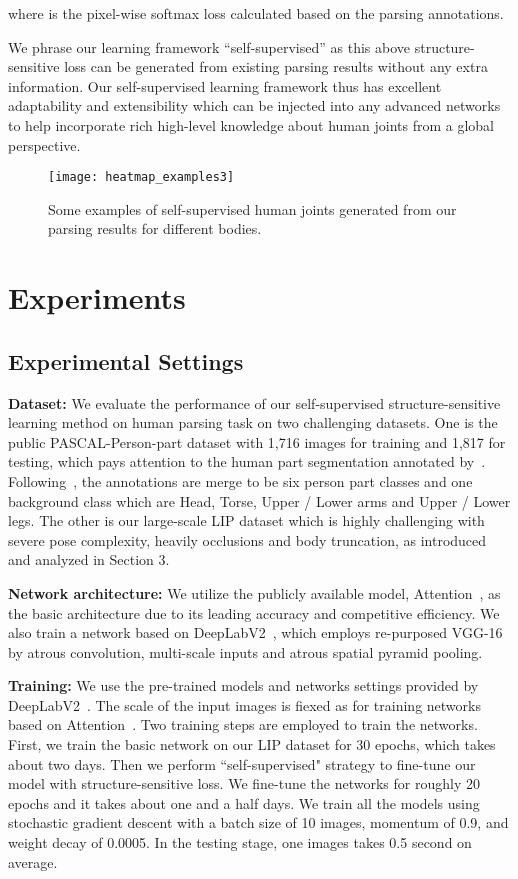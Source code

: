 \documentclass[10pt,twocolumn,letterpaper]{article}
\begin{document}
\vspace{-1mm}
where  is the pixel-wise softmax loss calculated based on the parsing annotations.

We phrase our learning framework ``self-supervised'' as this above structure-sensitive loss can be generated from existing parsing results without any extra information. Our self-supervised learning framework thus has excellent adaptability and extensibility which can be injected into any advanced networks to help incorporate rich
high-level knowledge about human joints from a global perspective. 
\begin{figure}[t]
\centering
\texttt{[image: heatmap\_examples3]}
\vspace{-3mm}
\caption{Some examples of self-supervised human joints generated from our parsing results for different bodies.}
\vspace{-4mm}
\label{fig:heatmap_example}
\end{figure}

\section{Experiments}
\subsection{Experimental Settings}
\textbf{Dataset: }
We evaluate the performance of our self-supervised structure-sensitive learning method on human parsing task on two challenging datasets. One is the public PASCAL-Person-part dataset with 1,716 images for training and 1,817 for testing, which pays attention to the human part segmentation annotated by~\cite{chen2014detect}. Following~\cite{chen2015attention,xia2015zoom}, the annotations are merge to be six person part classes and one background class which are Head, Torse, Upper / Lower arms and Upper / Lower legs. The other is our large-scale LIP dataset which is highly challenging with severe pose complexity, heavily occlusions and body truncation, as introduced and analyzed in Section 3.

\textbf{Network architecture: }
We utilize the publicly available model, Attention~\cite{chen2015attention}, as the basic architecture due to its leading accuracy and competitive efficiency. We also train a network based on DeepLabV2~\cite{chen2014semantic}, which employs re-purposed VGG-16 by atrous convolution, multi-scale inputs and atrous spatial pyramid pooling.

\textbf{Training: }
We use the pre-trained models and networks settings provided by DeepLabV2~\cite{chen2014semantic}. The scale of the input images is fiexed as  for training networks based on Attention~\cite{chen2015attention}. Two training steps are employed to train the networks. First, we train the basic network on our LIP dataset for 30 epochs, which takes about two days. Then we perform ``self-supervised" strategy to fine-tune our model with structure-sensitive loss. We fine-tune the networks for roughly 20 epochs and it takes about one and a half days. We train all the models using stochastic gradient descent with a batch size of 10 images, momentum of 0.9, and weight decay of 0.0005. In the testing stage, one images takes 0.5 second on average.
\end{document}
